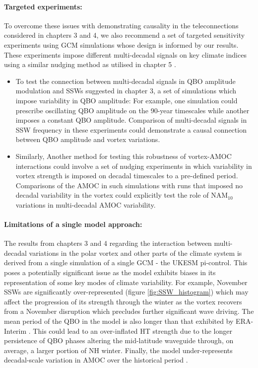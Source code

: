 \paragraph{Targeted experiments:}
To overcome these issues with demonstrating causality in the teleconnections considered in chapters 3 and 4, we also recommend a set of targeted sensitivity experiments using GCM simulations whose design is informed by our results. These experiments impose different multi-decadal signals on key climate indices using a similar nudging method as utilised in chapter 5 \citep{telfordTechnical2008}.

\begin{itemize}
    \item To test the connection between multi-decadal signals in QBO amplitude modulation and SSWs suggested in chapter 3, a set of simulations which impose variability in QBO amplitude: For example, one simulation could prescribe oscillating QBO amplitude on the 90-year timescales while another imposes a constant QBO amplitude. Comparison of multi-decadal signals in SSW frequency in these experiments could demonstrate a causal connection between QBO amplitude and vortex variations.  
    
    \item Similarly, Another method for testing this robustness of vortex-AMOC interactions could involve a set of nudging experiments in which variability in vortex strength is imposed on decadal timescales to a pre-defined period. Comparisons of the AMOC in such simulations with runs that imposed no decadal variability in the vortex could explicitly test the role of NAM$_{10}$ variations in multi-decadal AMOC variability. 
\end{itemize}

\paragraph{Limitations of a single model approach:}
The results from chapters 3 and 4 regarding the interaction between multi-decadal variations in the polar vortex and other parts of the climate system is derived from a single simulation of a single GCM - the UKESM pi-control. This poses a potentially significant issue as the model exhibits biases in its representation of some key modes of climate variability. For example, November SSWs are significantly over-represented (figure \ref{fig:SSW_histogram}) which may affect the progression of its strength through the winter as the vortex recovers from a November disruption which precludes further significant wave driving. The mean period of the QBO in the model is also longer than that exhibited by ERA-Interim \citep{bushellEvaluation2020b}. This could lead to an over-inflated HT strength due to the longer persistence of QBO phases altering the mid-latitude waveguide through, on average, a larger portion of NH winter. Finally, the model under-represents decadal-scale variation in AMOC over the historical period \citep{robsonEvaluation2020d}. 

